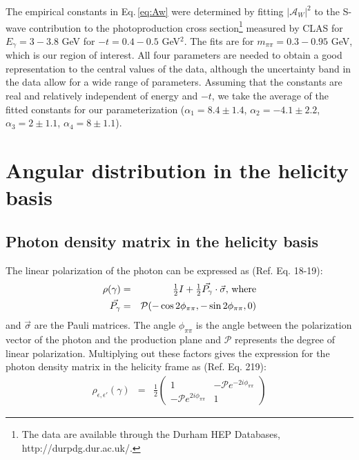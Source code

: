 The empirical constants in Eq.\,\ref{eq:Aw} were determined by fitting $|\mathcal{A}_W|^2$ to the S-wave contribution to the photoproduction 
cross section\footnote{The data are available through the Durham HEP Databases, http://durpdg.dur.ac.uk/.}  
measured by CLAS for $E_\gamma=3-3.8$ GeV \cite{Battaglieri:2009aa} for $-t=0.4-0.5$ GeV$^2$. The fits are for $m_{\pi\pi}=0.3-0.95$ GeV, which is our region of interest.
All four parameters are needed to obtain a good representation to the central values of the data, although the uncertainty band in the data allow for a wide range of parameters. 
Assuming that the constants are real and relatively independent of energy and $-t$,
we take the average of the fitted constants for our parameterization ($\alpha_1=8.4\pm1.4$,  $\alpha_2=-4.1\pm2.2$,  $\alpha_3=2\pm1.1$,  $\alpha_4=8\pm1.1$).

\section{Angular distribution in the helicity basis}

\subsection{Photon density matrix in the helicity basis}
The linear polarization of the photon can be expressed as (Ref.\cite{Schilling:1969um}  Eq. 18-19):
\begin{eqnarray}
\rho(\gamma) & = & \textstyle{1 \over 2} I + \textstyle{1 \over 2} \vec{P_{\gamma}} \cdot \vec{\sigma}, \, \rm{where} \label{eq:photon_sdmH} \\
\vec{P_\gamma} & = & \mathcal{P} (-\cos 2\phi_{\pi\pi}, -\sin 2\phi_{\pi\pi}, 0)
\end{eqnarray}
and $\vec{\sigma}$ are the Pauli matrices. The angle $\phi_{\pi\pi}$ is the angle between the polarization vector of the photon and the production plane and $\mathcal{P}$
represents the degree of linear polarization. Multiplying out these factors gives the expression for the 
photon density matrix in the helicity frame as (Ref.\cite{Salgado:2013dja}  Eq. 219):
\begin{eqnarray}
\rho_{\epsilon,\epsilon'} (\gamma) & = & \textstyle{\frac{1}{2}} \left( \begin{array}{cc} 1 & -\mathcal{P}e^{-2i\phi_{\pi\pi}} \\
-\mathcal{P}e^{2i\phi_{\pi\pi}} & 1 \end{array} \right)    \label{eq:dm_photon}
\end{eqnarray}

